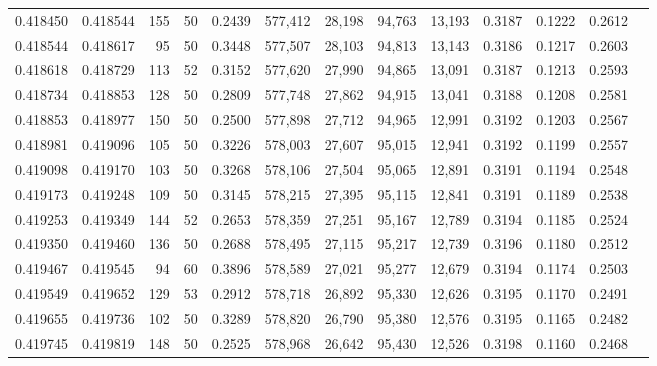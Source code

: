 \begin{tabular}{rrrrrrrrrrrrr}
0.418450 & 0.418544 &   155 &  50 &                                     0.2439 & 577,412 &  28,198 &  94,763 &  13,193 & 0.3187 & 0.1222 & 0.2612 \\
0.418544 & 0.418617 &    95 &  50 &                                     0.3448 & 577,507 &  28,103 &  94,813 &  13,143 & 0.3186 & 0.1217 & 0.2603 \\
0.418618 & 0.418729 &   113 &  52 &                                     0.3152 & 577,620 &  27,990 &  94,865 &  13,091 & 0.3187 & 0.1213 & 0.2593 \\
0.418734 & 0.418853 &   128 &  50 &                                     0.2809 & 577,748 &  27,862 &  94,915 &  13,041 & 0.3188 & 0.1208 & 0.2581 \\
0.418853 & 0.418977 &   150 &  50 &                                     0.2500 & 577,898 &  27,712 &  94,965 &  12,991 & 0.3192 & 0.1203 & 0.2567 \\
0.418981 & 0.419096 &   105 &  50 &                                     0.3226 & 578,003 &  27,607 &  95,015 &  12,941 & 0.3192 & 0.1199 & 0.2557 \\
0.419098 & 0.419170 &   103 &  50 &                                     0.3268 & 578,106 &  27,504 &  95,065 &  12,891 & 0.3191 & 0.1194 & 0.2548 \\
0.419173 & 0.419248 &   109 &  50 &                                     0.3145 & 578,215 &  27,395 &  95,115 &  12,841 & 0.3191 & 0.1189 & 0.2538 \\
0.419253 & 0.419349 &   144 &  52 &                                     0.2653 & 578,359 &  27,251 &  95,167 &  12,789 & 0.3194 & 0.1185 & 0.2524 \\
0.419350 & 0.419460 &   136 &  50 &                                     0.2688 & 578,495 &  27,115 &  95,217 &  12,739 & 0.3196 & 0.1180 & 0.2512 \\
0.419467 & 0.419545 &    94 &  60 &                                     0.3896 & 578,589 &  27,021 &  95,277 &  12,679 & 0.3194 & 0.1174 & 0.2503 \\
0.419549 & 0.419652 &   129 &  53 &                                     0.2912 & 578,718 &  26,892 &  95,330 &  12,626 & 0.3195 & 0.1170 & 0.2491 \\
0.419655 & 0.419736 &   102 &  50 &                                     0.3289 & 578,820 &  26,790 &  95,380 &  12,576 & 0.3195 & 0.1165 & 0.2482 \\
0.419745 & 0.419819 &   148 &  50 &                                     0.2525 & 578,968 &  26,642 &  95,430 &  12,526 & 0.3198 & 0.1160 & 0.2468 \\

\end{tabular}
